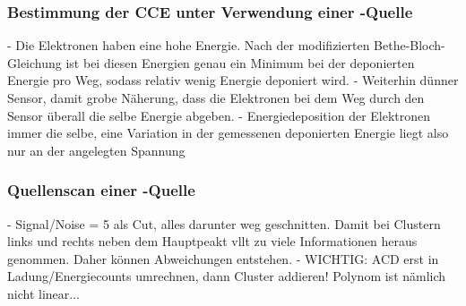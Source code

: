 \subsubsection{Bestimmung der CCE unter Verwendung einer \texorpdfstring{}{Sr}-Quelle}
\label{sec:CCEQ-Auswertung}

- Die Elektronen haben eine hohe Energie. Nach der modifizierten Bethe-Bloch-Gleichung
ist bei diesen Energien genau ein Minimum bei der deponierten Energie pro Weg, sodass
relativ wenig Energie deponiert wird.
- Weiterhin dünner Sensor, damit grobe Näherung, dass die Elektronen bei dem Weg durch
den Sensor überall die selbe Energie abgeben.
- Energiedeposition der Elektronen immer die selbe, eine Variation in der gemessenen
deponierten Energie liegt also nur an der angelegten Spannung

\subsubsection{Quellenscan einer \texorpdfstring{}{Sr}-Quelle}
\label{sec:Quellenscan-Auswertung}

- Signal/Noise = 5 als Cut, alles darunter weg geschnitten. Damit bei Clustern
links und rechts neben dem Hauptpeakt vllt zu viele Informationen heraus genommen.
Daher können Abweichungen entstehen.
- WICHTIG: ACD erst in Ladung/Energiecounts umrechnen, dann Cluster addieren!
Polynom ist nämlich nicht linear...
